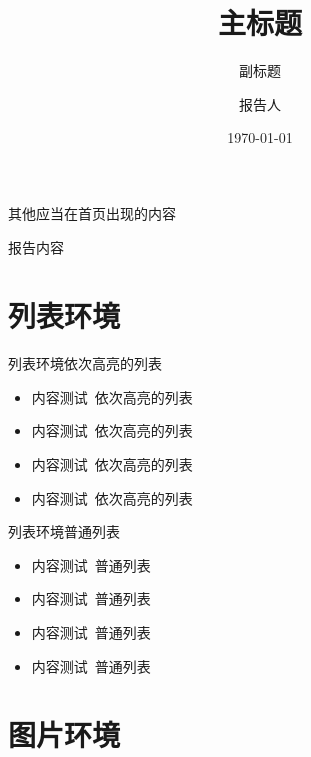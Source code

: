 \documentclass[no-math, compress]{beamer}
\begin{document}


\title{主标题}
\subtitle{副标题}
\author{报告人}
\date{\today}
\subject{}
\keywords{}

\begin{frame}
    \titlepage
    {\tiny 其他应当在首页出现的内容}
\end{frame}


\begin{frame}{报告内容}
    \tableofcontents
\end{frame}


\section{列表环境}


\begin{frame}{列表环境}{依次高亮的列表}
    \begin{itemize}[<+-| alert@+>]
        \item 内容测试~依次高亮的列表
        \item 内容测试~依次高亮的列表
        \item 内容测试~依次高亮的列表
        \item 内容测试~依次高亮的列表
    \end{itemize}
\end{frame}


\begin{frame}{列表环境}{普通列表}
    \begin{itemize}
        \item 内容测试~普通列表
        \item 内容测试~普通列表
        \item 内容测试~普通列表
        \item 内容测试~普通列表
    \end{itemize}
\end{frame}


\section{图片环境}
\end{document}
